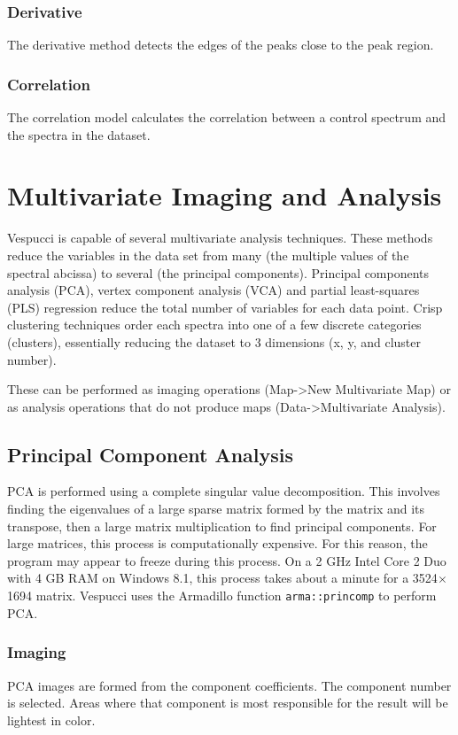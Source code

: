 \documentclass[12pt]{achemso} %
\begin{document}
\subsubsection{Derivative} The derivative method detects the edges of the peaks
close to the peak region.

\subsubsection{Correlation} The correlation model calculates the correlation between 
a control spectrum and the spectra in the dataset.

\newpage 
\section{Multivariate Imaging and Analysis}
Vespucci is capable of several multivariate analysis techniques. These methods
reduce the variables in the data set from many (the multiple values of the
spectral abcissa) to several (the principal components). Principal components
analysis (PCA), vertex component analysis (VCA) and partial least-squares (PLS)
regression reduce the total number of variables for each data point. Crisp
clustering techniques order each spectra into one of a few discrete categories
(clusters), essentially reducing the dataset to 3 dimensions (x, y, and cluster
number).

These can be performed as imaging operations (Map->New Multivariate Map) or as
analysis operations that do not produce maps (Data->Multivariate Analysis).

\subsection{Principal Component Analysis} PCA is performed using a complete
singular value decomposition. This involves finding the eigenvalues of a large
sparse matrix formed by the matrix and its transpose, then a large matrix
multiplication to find principal components. For large matrices, this process is
computationally expensive. For this reason, the program may appear to freeze
during this process. On a 2 GHz Intel Core 2 Duo with 4 GB RAM on Windows 8.1,
this process takes about a minute for a 3524\(\times\)1694 matrix. Vespucci uses
the Armadillo function \texttt{arma::princomp} to perform PCA.

\subsubsection{Imaging} PCA images are formed from the component coefficients.
The component number is selected. Areas where that component is most responsible
for the result will be lightest in color.
\end{document}
